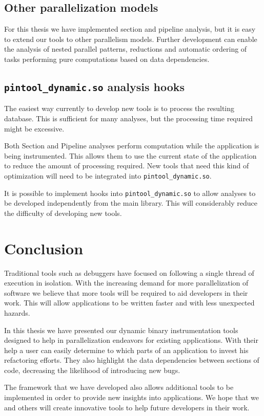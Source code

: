 \subsection{Other parallelization models}

For this thesis we have implemented section and pipeline analysis, but it is easy to extend our tools to other parallelism models. Further development can enable the analysis of nested parallel patterns, reductions and automatic ordering of tasks performing pure computations based on data dependencies.

\subsection{\texttt{pintool\_dynamic.so} analysis hooks}

The easiest way currently to develop new tools is to process the resulting database. This is sufficient for many analyses, but the processing time required might be excessive.

Both Section and Pipeline analyses perform computation while the application is being instrumented. This allows them to use the current state of the application to reduce the amount of processing required. New tools that need this kind of optimization will need to be integrated into \texttt{pintool\_dynamic.so}.

It is possible to implement hooks into \texttt{pintool\_dynamic.so} to allow analyses to be developed independently from the main library. This will considerably reduce the difficulty of developing new tools.

\section{Conclusion}

Traditional tools such as debuggers have focused on following a single thread of execution in isolation. With the increasing demand for more parallelization of software we believe that more tools will be required to aid developers in their work. This will allow applications to be written faster and with less unexpected hazards.

In this thesis we have presented our dynamic binary instrumentation tools designed to help in parallelization endeavors for existing applications. With their help a user can easily determine to which parts of an application to invest his refactoring efforts. They also highlight the data dependencies between sections of code, decreasing the likelihood of introducing new bugs.

The framework that we have developed also allows additional tools to be implemented in order to provide new insights into applications. We hope that we and others will create innovative tools to help future developers in their work.